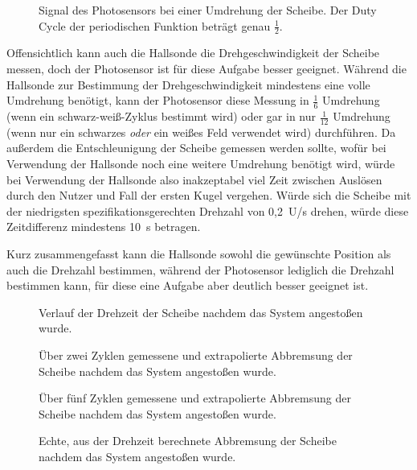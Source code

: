 \documentclass{kis}
\begin{document}
\begin{figure}
	\centering
	
	\caption[Signal des Photosensors bei einer Umdrehung der Scheibe.]{Signal des Photosensors bei einer Umdrehung der Scheibe. Der Duty Cycle der periodischen Funktion beträgt genau $\frac{1}{2}$.}
	\label{fig:photosensor}
\end{figure}

Offensichtlich kann auch die Hallsonde die Drehgeschwindigkeit der Scheibe messen, doch der Photosensor ist für diese Aufgabe besser geeignet. Während die Hallsonde zur Bestimmung der Drehgeschwindigkeit mindestens eine volle Umdrehung benötigt, kann der Photosensor diese Messung in $\frac{1}{6}$ Umdrehung (wenn ein schwarz-weiß-Zyklus bestimmt wird) oder gar in nur $\frac{1}{12}$ Umdrehung (wenn nur ein schwarzes \emph{oder} ein weißes Feld verwendet wird) durchführen. Da außerdem die Entschleunigung der Scheibe gemessen werden sollte, wofür bei Verwendung der Hallsonde noch eine weitere Umdrehung benötigt wird, würde bei Verwendung der Hallsonde also inakzeptabel viel Zeit zwischen Auslösen durch den Nutzer und Fall der ersten Kugel vergehen. Würde sich die Scheibe mit der niedrigsten spezifikationsgerechten Drehzahl von 0,2~U/s drehen, würde diese Zeitdifferenz mindestens 10~s betragen.

Kurz zusammengefasst kann die Hallsonde sowohl die gewünschte Position als auch die Drehzahl bestimmen, während der Photosensor lediglich die Drehzahl bestimmen kann, für diese eine Aufgabe aber deutlich besser geeignet ist.

\begin{figure}
	
	\caption{Verlauf der Drehzeit der Scheibe nachdem das System angestoßen wurde.}
	\label{fig:turn_time}
\end{figure}

\begin{figure}
	
	\caption{Über zwei Zyklen gemessene und extrapolierte Abbremsung der Scheibe nachdem das System angestoßen wurde.}
	\label{fig:deceleration_two}
\end{figure}

\begin{figure}
	
	\caption{Über fünf Zyklen gemessene und extrapolierte Abbremsung der Scheibe nachdem das System angestoßen wurde.}
	\label{fig:deceleration_five}
\end{figure}

\begin{figure}
	
	\caption{Echte, aus der Drehzeit berechnete Abbremsung der Scheibe nachdem das System angestoßen wurde.}
	\label{fig:deceleration_true}
\end{figure}
\end{document}
